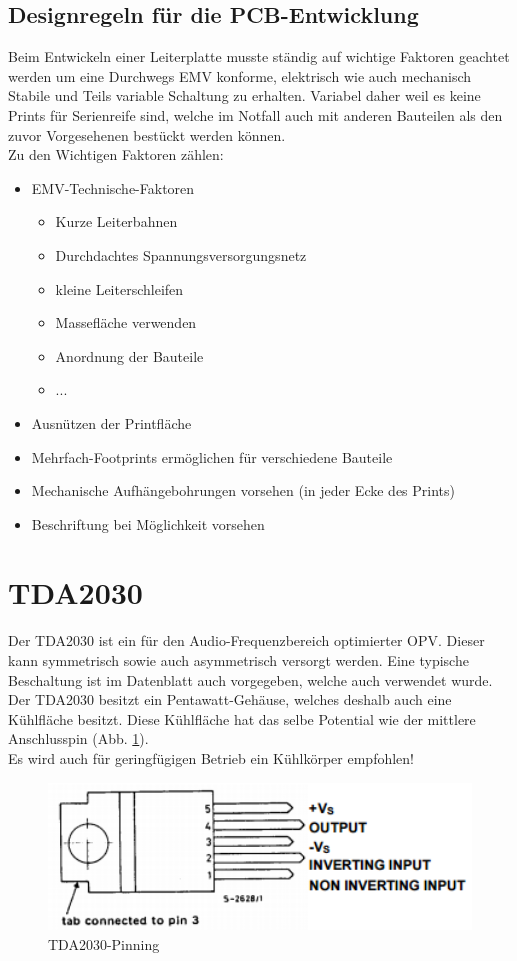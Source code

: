 \subsection{Designregeln für die PCB-Entwicklung}
Beim Entwickeln einer Leiterplatte musste ständig auf wichtige Faktoren geachtet werden um eine Durchwegs EMV konforme, elektrisch wie auch mechanisch Stabile und Teils variable Schaltung zu erhalten. Variabel daher weil es keine Prints für Serienreife sind, welche im Notfall auch mit anderen Bauteilen als den zuvor Vorgesehenen bestückt werden können.\\
Zu den Wichtigen Faktoren zählen:
\begin{itemize}
	\item EMV-Technische-Faktoren
	\begin{itemize}
		\item Kurze Leiterbahnen
		\item Durchdachtes Spannungsversorgungsnetz
		\item kleine Leiterschleifen
		\item Massefläche verwenden
		\item Anordnung der Bauteile
		\item ...
	\end{itemize}
	\item Ausnützen der Printfläche
	\item Mehrfach-Footprints ermöglichen für verschiedene Bauteile
	\item Mechanische Aufhängebohrungen vorsehen (in jeder Ecke des Prints)
	\item Beschriftung bei Möglichkeit vorsehen
\end{itemize}




\section{TDA2030}\label{sec:3.2}
Der TDA2030 ist ein für den Audio-Frequenzbereich optimierter OPV. Dieser kann symmetrisch sowie auch asymmetrisch versorgt werden. Eine typische Beschaltung ist im Datenblatt auch vorgegeben, welche auch verwendet wurde. Der TDA2030 besitzt ein Pentawatt-Gehäuse, welches deshalb auch eine Kühlfläche besitzt. Diese Kühlfläche hat das selbe Potential wie der mittlere Anschlusspin (Abb. \ref{fig:3.2.1}).\\
Es wird auch für geringfügigen Betrieb ein Kühlkörper empfohlen!
\begin{figure} [H]
	\centering
	\includegraphics[width=1\textwidth]{img/Print5/TDA2030Pinning.PNG}
	\caption{TDA2030-Pinning}
	\label {fig:3.2.1}
\end{figure}
